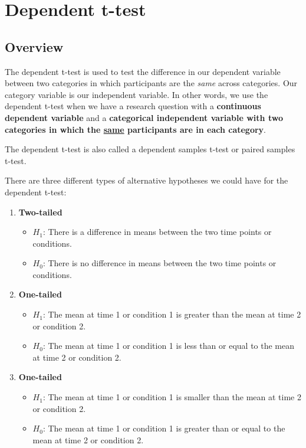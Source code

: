 \documentclass[
]{book}
\providecommand{\tightlist}{%
  \setlength{\itemsep}{0pt}\setlength{\parskip}{0pt}}
\begin{document}
\hypertarget{dependent-t-test}{%
\chapter{Dependent t-test}\label{dependent-t-test}}

\hypertarget{overview-1}{%
\section{Overview}\label{overview-1}}

The dependent t-test is used to test the difference in our dependent variable between two categories in which participants are the \emph{same} across categories. Our category variable is our independent variable. In other words, we use the dependent t-test when we have a research question with a \textbf{continuous dependent variable} and a \textbf{categorical independent variable with two categories in which the \underline{same} participants are in each category}.

The dependent t-test is also called a dependent samples t-test or paired samples t-test.

There are three different types of alternative hypotheses we could have for the dependent t-test:

\begin{enumerate}
\def\labelenumi{\arabic{enumi}.}
\item
  \textbf{Two-tailed}

  \begin{itemize}
  \tightlist
  \item
    \(H_1\): There is a difference in means between the two time points or conditions.
  \item
    \(H_0\): There is no difference in means between the two time points or conditions.
  \end{itemize}
\item
  \textbf{One-tailed}

  \begin{itemize}
  \tightlist
  \item
    \(H_1\): The mean at time 1 or condition 1 is greater than the mean at time 2 or condition 2.
  \item
    \(H_0\): The mean at time 1 or condition 1 is less than or equal to the mean at time 2 or condition 2.
  \end{itemize}
\item
  \textbf{One-tailed}

  \begin{itemize}
  \tightlist
  \item
    \(H_1\): The mean at time 1 or condition 1 is smaller than the mean at time 2 or condition 2.
  \item
    \(H_0\): The mean at time 1 or condition 1 is greater than or equal to the mean at time 2 or condition 2.
  \end{itemize}
\end{enumerate}
\end{document}

